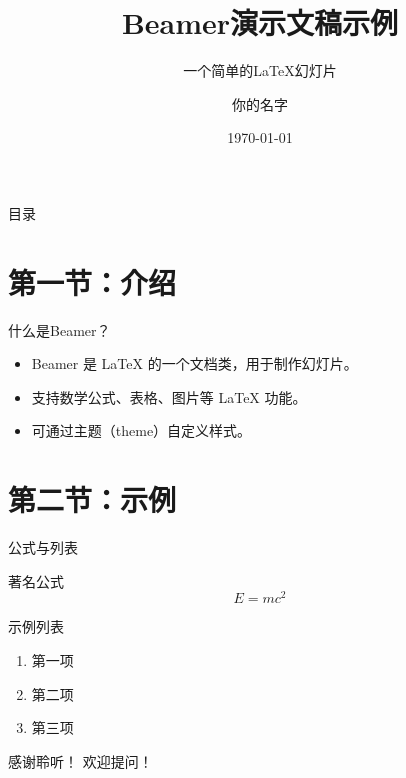 \documentclass[10pt]{beamer} %
\title{Beamer演示文稿示例}
\subtitle{一个简单的LaTeX幻灯片}
\author{你的名字}
\institute{某某大学}
\date{\today}
\begin{document}
\begin{frame}
    \titlepage %
\end{frame}

\begin{frame}{目录}
    \tableofcontents %
\end{frame}

\section{第一节：介绍}
\begin{frame}{什么是Beamer？}
    \begin{itemize}
        \item Beamer 是 LaTeX 的一个文档类，用于制作幻灯片。
        \item 支持数学公式、表格、图片等 LaTeX 功能。
        \item 可通过主题（theme）自定义样式。
    \end{itemize}
\end{frame}

\section{第二节：示例}
\begin{frame}{公式与列表}
    \begin{block}{著名公式}
        \[ E = mc^2 \]
    \end{block}
    \begin{exampleblock}{示例列表}
        \begin{enumerate}
            \item 第一项
            \item 第二项
            \item 第三项
        \end{enumerate}
    \end{exampleblock}
\end{frame}

\begin{frame}{感谢聆听！}
    \centering
    \Large 欢迎提问！
\end{frame}
\end{document}
